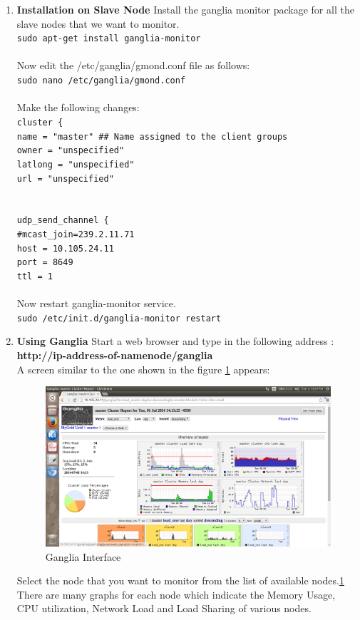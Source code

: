 \documentclass[12pt]{book}
\newcommand{\shellcmd}[1]{\\\indent\texttt{\footnotesize #1}\\}
\begin{document}
\begin{enumerate}
\item \textbf{Installation on Slave Node}
Install the ganglia monitor package for all the slave nodes that we want to monitor.
\shellcmd{sudo apt-get install ganglia-monitor}\\\noindent
Now edit the /etc/ganglia/gmond.conf file as follows:
\shellcmd{sudo nano /etc/ganglia/gmond.conf}\\\noindent
Make the following changes:
\shellcmd{cluster \{ \\\indent 
name = "master" \#\# Name assigned to the client groups\\\indent 
owner = "unspecified"\\\indent 
latlong = "unspecified"\\\indent 
url = "unspecified"\\\indent }
\shellcmd{udp\_send\_channel \{ \\\indent 
\#mcast\_join=239.2.11.71\\\indent 
host = 10.105.24.11\\\indent 
port = 8649\\\indent 
ttl = 1\\\indent}
Now restart ganglia-monitor service.
\shellcmd{sudo /etc/init.d/ganglia-monitor restart}
\item \textbf{Using Ganglia}
Start a web browser and type in the following address :
\textbf{http://ip-address-of-namenode/ganglia}\\
A screen similar to the one shown in the figure \ref{fig:fig2_ganglia} appears:
\begin{figure}[!htb]
 \centering
 \includegraphics[width=15cm]{./ganglia.png}
 \caption{Ganglia Interface \label{fig:fig2_ganglia}} 
\end{figure}
Select the node that you want to monitor from the list of available nodes.\ref{fig:fig2_ganglia} There are
many graphs for each node which indicate the Memory Usage, CPU utilization, Network
Load and Load Sharing of various nodes.
\end{enumerate}
\end{document}
